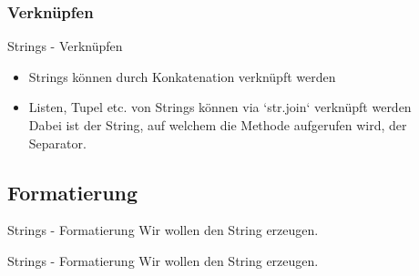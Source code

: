\subsubsection{Verknüpfen}
\begin{frame}[fragile]{Strings - Verknüpfen}
	\begin{itemize}
	    \item Strings können durch Konkatenation verknüpft werden \\
	    
	    \item Listen, Tupel etc. von Strings können via `str.join` verknüpft werden \\
	    
	    Dabei ist der String, auf welchem die Methode aufgerufen wird, der Separator.
	\end{itemize}
\end{frame}


\subsection{Formatierung}
\begin{frame}[fragile]{Strings - Formatierung}
	Wir wollen den String  erzeugen.

	
\end{frame}

\begin{frame}[fragile]{Strings - Formatierung}
	Wir wollen den String  erzeugen.
	
\end{frame}





